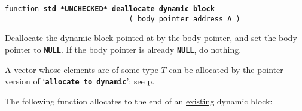 \documentclass[12pt]{article}
\newcommand{\TT}[1]{{\tt \bfseries #1}}
\newcommand{\pagref}[1]{p\pageref{#1}}
\newcommand{\TS}{\hspace*{0in}\tt}
\newenvironment{indpar}[1][0.3in]%
	{\begin{list}{}%
		     {\setlength{\itemsep}{0in}%
		      \setlength{\topsep}{0in}%
		      \setlength{\parsep}{1ex}%
		      \setlength{\labelwidth}{#1}%
		      \setlength{\leftmargin}{#1}%
		      \addtolength{\leftmargin}{\labelsep}}%
	 \item}%
	{\end{list}}
\begin{document}
\begin{indpar}
\begin{indpar}
\end{indpar}

{\tt function \TT{std *UNCHECKED* deallocate dynamic block}%
	       \\
\TS~~~~~~~~~~~~~~~~~~~~~~~~~~~~~( body pointer address A )}

\begin{indpar}
Deallocate the dynamic block pointed at by the body pointer,
and set the body pointer to \TT{NULL}.  If
the body pointer is already \TT{NULL}, do nothing.
\end{indpar}

\end{indpar}

A vector whose elements are of some type $T$ can be allocated by
the pointer version of `\TT{allocate to dynamic}': see
\pagref{POINTER-ALLOCATE-TO-DYNAMIC}.

The following function allocates to the end of an \underline{existing}
dynamic block:
\end{document}
